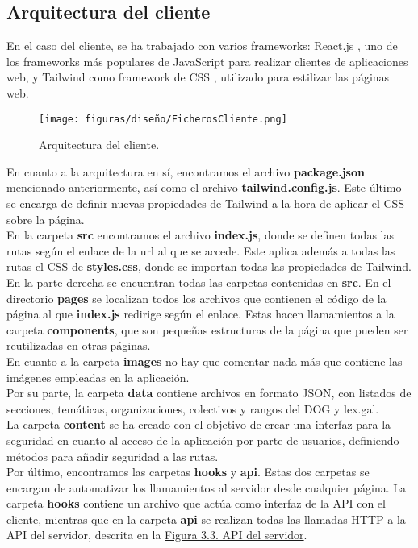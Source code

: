 \subsection{Arquitectura del cliente}

En el caso del cliente, se ha trabajado con varios frameworks: React.js \cite{react}, uno de los frameworks más populares de JavaScript para realizar clientes de aplicaciones web, y Tailwind \cite{tailwind} como framework de CSS \cite{css}, utilizado para estilizar las páginas web.

\begin{figure}[H]
\centerline{\texttt{[image: figuras/diseño/FicherosCliente.png]}}
\caption{Arquitectura del cliente.}
\label{enlaceArquitecturaCliente}
\end{figure}

En cuanto a la arquitectura en sí, encontramos el archivo {\bf package.json} mencionado anteriormente, así como el archivo {\bf tailwind.config.js}. Este último se encarga de definir nuevas propiedades de Tailwind a la hora de aplicar el CSS sobre la página.
\\

En la carpeta {\bf src} encontramos el archivo {\bf index.js}, donde se definen todas las rutas según el enlace de la url al que se accede. Este aplica además a todas las rutas el CSS de {\bf styles.css}, donde se importan todas las propiedades de Tailwind.
\\

En la parte derecha se encuentran todas las carpetas contenidas en {\bf src}. En el directorio {\bf pages} se localizan todos los archivos que contienen el código de la página al que {\bf index.js} redirige según el enlace. Estas hacen llamamientos a la carpeta {\bf components}, que son pequeñas estructuras de la página que pueden ser reutilizadas en otras páginas.
\\

En cuanto a la carpeta {\bf images} no hay que comentar nada más que contiene las imágenes empleadas en la aplicación.
\\

Por su parte, la carpeta {\bf data} contiene archivos en formato JSON, con listados de secciones, temáticas, organizaciones, colectivos y rangos del DOG y lex.gal.
\\

La carpeta {\bf content} se ha creado con el objetivo de crear una interfaz para la seguridad en cuanto al acceso de la aplicación por parte de usuarios, definiendo métodos para añadir seguridad a las rutas.
\\

Por último, encontramos las carpetas {\bf hooks} y {\bf api}. Estas dos carpetas se encargan de automatizar los llamamientos al servidor desde cualquier página. La carpeta {\bf hooks} contiene un archivo que actúa como interfaz de la API con el cliente, mientras que en la carpeta {\bf api} se realizan todas las llamadas HTTP a la API del servidor, descrita en la \hyperref[enlaceAPIServidor]{Figura 3.3. API del servidor}.